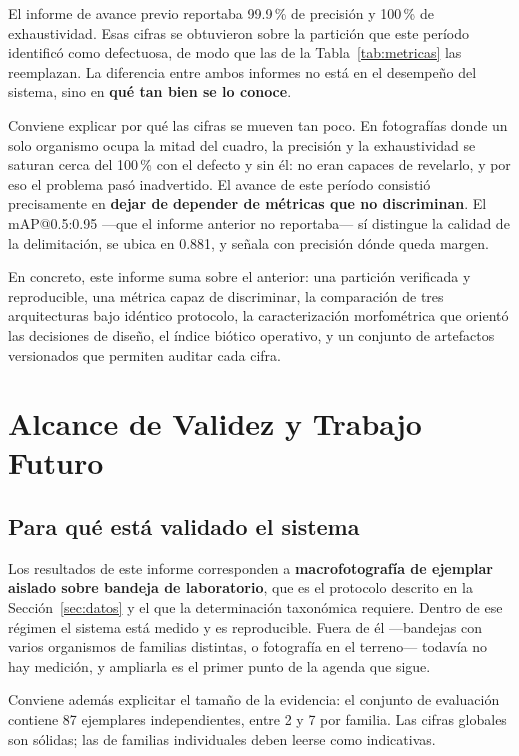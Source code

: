 \documentclass[onecolumn]{article}
\begin{document}
El informe de avance previo reportaba 99.9\,\% de precisión y 100\,\% de exhaustividad. Esas cifras se obtuvieron sobre la partición que este período identificó como defectuosa, de modo que las de la Tabla~\ref{tab:metricas} las reemplazan. La diferencia entre ambos informes no está en el desempeño del sistema, sino en \textbf{qué tan bien se lo conoce}.

Conviene explicar por qué las cifras se mueven tan poco. En fotografías donde un solo organismo ocupa la mitad del cuadro, la precisión y la exhaustividad se saturan cerca del 100\,\% con el defecto y sin él: no eran capaces de revelarlo, y por eso el problema pasó inadvertido. El avance de este período consistió precisamente en \textbf{dejar de depender de métricas que no discriminan}. El mAP@0.5:0.95 ---que el informe anterior no reportaba--- sí distingue la calidad de la delimitación, se ubica en 0.881, y señala con precisión dónde queda margen.

En concreto, este informe suma sobre el anterior: una partición verificada y reproducible, una métrica capaz de discriminar, la comparación de tres arquitecturas bajo idéntico protocolo, la caracterización morfométrica que orientó las decisiones de diseño, el índice biótico operativo, y un conjunto de artefactos versionados que permiten auditar cada cifra.

\section{Alcance de Validez y Trabajo Futuro}
\label{sec:futuro}

\subsection{Para qué está validado el sistema}

Los resultados de este informe corresponden a \textbf{macrofotografía de ejemplar aislado sobre bandeja de laboratorio}, que es el protocolo descrito en la Sección~\ref{sec:datos} y el que la determinación taxonómica requiere. Dentro de ese régimen el sistema está medido y es reproducible. Fuera de él ---bandejas con varios organismos de familias distintas, o fotografía en el terreno--- todavía no hay medición, y ampliarla es el primer punto de la agenda que sigue.

Conviene además explicitar el tamaño de la evidencia: el conjunto de evaluación contiene 87 ejemplares independientes, entre 2 y 7 por familia. Las cifras globales son sólidas; las de familias individuales deben leerse como indicativas.
\end{document}
